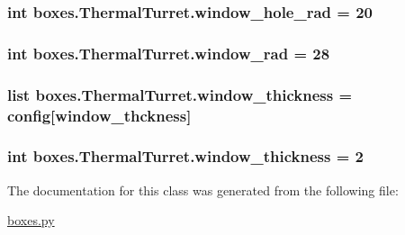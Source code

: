 \subsubsection[{window\+\_\+hole\+\_\+rad}]{\setlength{\rightskip}{0pt plus 5cm}int boxes.\+Thermal\+Turret.\+window\+\_\+hole\+\_\+rad = 20\hspace{0.3cm}{\ttfamily [static]}}\label{classboxes_1_1_thermal_turret_a7700fadf35f25068cf68c73c2bdbbcc7}
\hypertarget{classboxes_1_1_thermal_turret_a95d0367c1f976db346546a5bfa66de19}{}
\subsubsection[{window\+\_\+rad}]{\setlength{\rightskip}{0pt plus 5cm}int boxes.\+Thermal\+Turret.\+window\+\_\+rad = 28\hspace{0.3cm}{\ttfamily [static]}}\label{classboxes_1_1_thermal_turret_a95d0367c1f976db346546a5bfa66de19}
\hypertarget{classboxes_1_1_thermal_turret_aec3eeb69c8f1c74fc941ce7bbe79231f}{}
\subsubsection[{window\+\_\+thickness}]{\setlength{\rightskip}{0pt plus 5cm}list boxes.\+Thermal\+Turret.\+window\+\_\+thickness = config\mbox{[}\textquotesingle{}window\+\_\+thckness\textquotesingle{}\mbox{]}\hspace{0.3cm}{\ttfamily [static]}}\label{classboxes_1_1_thermal_turret_aec3eeb69c8f1c74fc941ce7bbe79231f}
\hypertarget{classboxes_1_1_thermal_turret_a48e28948ac70c45aa41b3ee3f1260c88}{}
\subsubsection[{window\+\_\+thickness}]{\setlength{\rightskip}{0pt plus 5cm}int boxes.\+Thermal\+Turret.\+window\+\_\+thickness = 2\hspace{0.3cm}{\ttfamily [static]}}\label{classboxes_1_1_thermal_turret_a48e28948ac70c45aa41b3ee3f1260c88}


The documentation for this class was generated from the following file\+:\begin{DoxyCompactItemize}
\item 
\hyperlink{boxes_8py}{boxes.\+py}\end{DoxyCompactItemize}

